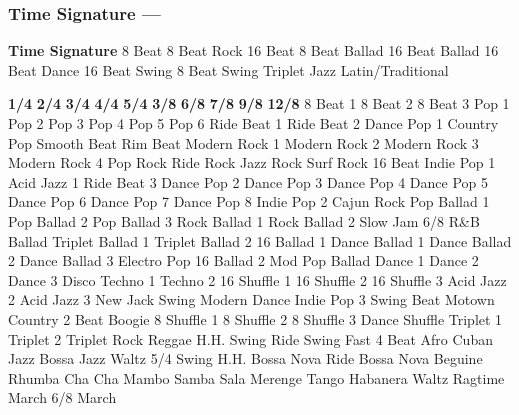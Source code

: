 \subsubsection[Time Signature]{Time Signature --- \UiKey{\II}\UiKey{\MET}}
\textbf{Time Signature}
8 Beat
8 Beat Rock
16 Beat
8 Beat Ballad
16 Beat Ballad
16 Beat Dance
16 Beat Swing
8 Beat Swing
Triplet
Jazz
Latin/Traditional





























\textbf{1/4}
\textbf{2/4}
\textbf{3/4}
\textbf{4/4}
\textbf{5/4}
\textbf{3/8}
\textbf{6/8}
\textbf{7/8}
\textbf{9/8}
\textbf{12/8}
8 Beat 1
8 Beat 2
8 Beat 3
Pop 1
Pop 2
Pop 3
Pop 4
Pop 5
Pop 6
Ride Beat 1
Ride Beat 2
Dance Pop 1
Country Pop
Smooth Beat
Rim Beat
Modern Rock 1
Modern Rock 2
Modern Rock 3
Modern Rock 4
Pop Rock
Ride Rock
Jazz Rock
Surf Rock
16 Beat
Indie Pop 1
Acid Jazz 1
Ride Beat 3
Dance Pop 2
Dance Pop 3
Dance Pop 4
Dance Pop 5
Dance Pop 6
Dance Pop 7
Dance Pop 8
Indie Pop 2
Cajun Rock
Pop Ballad 1
Pop Ballad 2
Pop Ballad 3
Rock Ballad 1
Rock Ballad 2
Slow Jam
6/8 R\&B Ballad
Triplet Ballad 1
Triplet Ballad 2
16 Ballad 1
Dance Ballad 1
Dance Ballad 2
Dance Ballad 3
Electro Pop
16 Ballad 2
Mod Pop Ballad
Dance 1
Dance 2
Dance 3
Disco
Techno 1
Techno 2
16 Shuffle 1
16 Shuffle 2
16 Shuffle 3
Acid Jazz 2
Acid Jazz 3
New Jack Swing
Modern Dance
Indie Pop 3
Swing Beat
Motown
Country 2 Beat
Boogie
8 Shuffle 1
8 Shuffle 2
8 Shuffle 3
Dance Shuffle
Triplet 1
Triplet 2
Triplet Rock
Reggae
H.H. Swing
Ride Swing
Fast 4 Beat
Afro Cuban
Jazz Bossa
Jazz Waltz
5/4 Swing
H.H. Bossa Nova
Ride Bossa Nova
Beguine
Rhumba
Cha Cha
Mambo
Samba
Sala
Merenge
Tango
Habanera
Waltz
Ragtime
March
6/8 March
